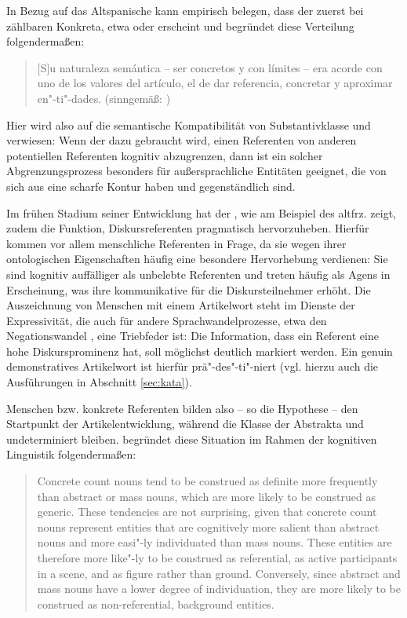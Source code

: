 In Bezug auf das Altspanische kann \textcite[421]{Company1991} empirisch belegen, dass der  zuerst bei zählbaren  Konkreta, etwa  oder  erscheint und begründet diese Verteilung folgendermaßen: \blockcquote[421]{Company1991}{[S]u naturaleza semántica -- ser  concretos y con límites -- era acorde
con uno de los valores del artículo, el de dar referencia, concretar y aproximar
en"-ti"-dades. (sinngemäß: )} Hier wird also auf die semantische Kompatibilität von Substantivklasse  und  verwiesen:  Wenn der  dazu gebraucht wird, einen Referenten von anderen potentiellen Referenten kognitiv abzugrenzen, dann ist ein solcher Abgrenzungsprozess besonders für außersprachliche Entitäten geeignet, die von sich aus eine scharfe Kontur haben und gegenständlich sind.

\hspace*{-1.35165pt}Im frühen Stadium seiner Entwicklung hat der , wie \textcite{Epstein1993,Epstein1994} am Beispiel des altfrz.  zeigt, zudem die Funktion, Diskursreferenten pragmatisch hervorzuheben. Hierfür kommen vor allem menschliche Referenten in Frage, da sie wegen ihrer ontologischen Eigenschaften häufig eine besondere Hervorhebung verdienen: Sie sind kognitiv auffälliger als unbelebte  Referenten und treten häufig als Agens  in Erscheinung, was ihre kommunikative  für die Diskursteilnehmer erhöht. Die Auszeichnung von Menschen mit einem Artikelwort steht im Dienste der Expressivität, die auch für andere Sprachwandelprozesse, etwa den Negationswandel \parencite{Jager2008}, eine Triebfeder ist: Die Information, dass ein Referent eine hohe Diskursprominenz hat, soll möglichst deutlich markiert werden. Ein genuin demonstratives Artikelwort  ist hierfür prä"-des"-ti"-niert (vgl. hierzu auch die Ausführungen in Abschnitt \ref{sec:kata}).

Menschen bzw. konkrete  Referenten bilden also -- so die Hypothese -- den Startpunkt der Artikelentwicklung, während die Klasse der Abstrakta  und  undeterminiert bleiben. \textcite{Epstein1994} begründet diese Situation im Rahmen der kognitiven Linguistik folgendermaßen: \blockcquote[71]{Epstein1994}{Concrete count nouns tend to be construed as definite more frequently than
abstract or mass nouns, which are more likely to be construed as generic.
These tendencies are not surprising, given that concrete count nouns represent
entities that are cognitively more salient than abstract nouns and more
easi"-ly individuated than mass nouns. These entities are therefore more
like"-ly to be construed as referential, as active participants in a scene, and as figure rather than ground. Conversely, since abstract and mass nouns have
a lower degree of individuation, they are more likely to be construed as
non-referential, background entities.} 


